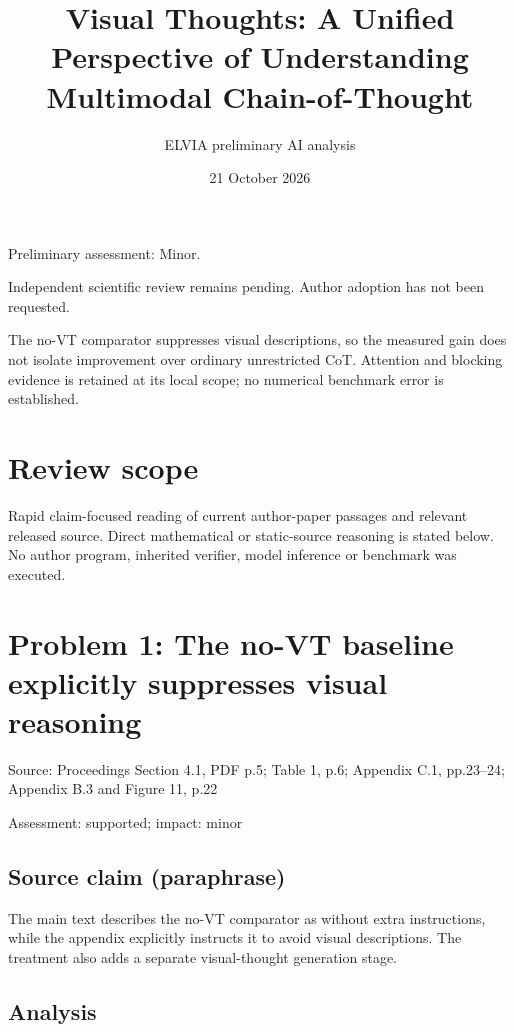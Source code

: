 \documentclass[11pt]{article}
\begin{document}
\title{Visual Thoughts: A Unified Perspective of Understanding Multimodal Chain-of-Thought}

\author{ELVIA preliminary AI analysis}\date{21 October 2026}\maketitle

Preliminary assessment: Minor.\par

Independent scientific review remains pending. Author adoption has not been requested.

The no-VT comparator suppresses visual descriptions, so the measured gain does not isolate improvement over ordinary unrestricted CoT. Attention and blocking evidence is retained at its local scope; no numerical benchmark error is established.

\section*{Review scope}

Rapid claim-focused reading of current author-paper passages and relevant released source. Direct mathematical or static-source reasoning is stated below. No author program, inherited verifier, model inference or benchmark was executed.

\section*{Problem 1: The no-VT baseline explicitly suppresses visual reasoning}

Source: Proceedings Section 4.1, PDF p.5; Table 1, p.6; Appendix C.1, pp.23–24; Appendix B.3 and Figure 11, p.22

Assessment: supported; impact: minor

\subsection*{Source claim (paraphrase)}

The main text describes the no-VT comparator as without extra instructions, while the appendix explicitly instructs it to avoid visual descriptions. The treatment also adds a separate visual-thought generation stage.

\subsection*{Analysis}
\end{document}
